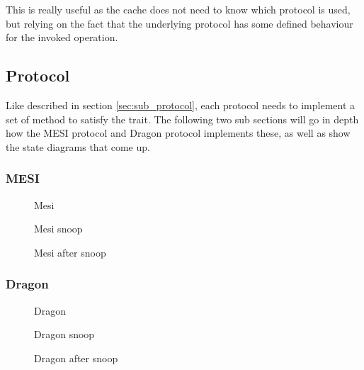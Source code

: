 This is really useful as the cache does not need to know which protocol is used, but relying on the
fact that the underlying protocol has some defined behaviour for the invoked operation.


\subsection{Protocol}
Like described in section \ref{sec:sub_protocol}, each protocol needs to implement a set of method
to satisfy the trait.  The following two sub sections will go in depth how the MESI protocol and
Dragon protocol implements these, as well as show the state diagrams that come up.

\subsubsection{MESI}

\begin{figure}[ht]
    \centering
    \caption{Mesi}
    \label{fig:mesi}
\end{figure}

\begin{figure}[ht]
    \centering
    \caption{Mesi snoop}
    \label{fig:mesi_snoop}
\end{figure}

\begin{figure}[ht]
    \centering
    \caption{Mesi after snoop}
    \label{fig:mesi_after_snoop}
\end{figure}

\subsubsection{Dragon}

\begin{figure}[ht]
    \centering
    \caption{Dragon}
    \label{fig:dragon}
\end{figure}


\begin{figure}[ht]
    \centering
    \caption{Dragon snoop}
    \label{fig:dragon_snoop}
\end{figure}

\begin{figure}[ht]
    \centering
    \caption{Dragon after snoop}
    \label{fig:dragon_after_snoop}
\end{figure}
